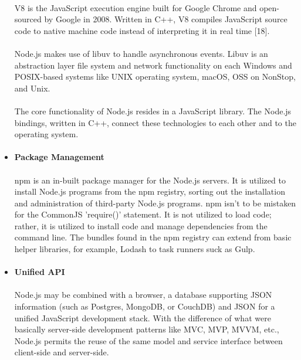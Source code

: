 \documentclass[../thesis.tex]{subfiles}
\begin{document}
\begin{itemize}
    \paragraph{}
    V8 is the JavaScript execution engine built for Google Chrome and open-sourced by Google in 2008. Written in C++, V8 compiles JavaScript source code to native machine code instead of interpreting it in real time [18].
    \paragraph{}
    Node.js makes use of libuv to handle asynchronous events. Libuv is an abstraction layer file system and network functionality on each Windows and POSIX-based systems like UNIX operating system, macOS, OSS on NonStop, and Unix.
    \paragraph{}
    The core functionality of Node.js resides in a JavaScript library. The Node.js bindings, written in C++, connect these technologies to each other and to the operating system.
    \paragraph{}
    \item \textbf{Package Management}
    \paragraph{}
    npm is an in-built package manager for the Node.js servers. It is utilized to install Node.js programs from the npm registry, sorting out the installation and administration of third-party Node.js programs. npm isn't to be mistaken for the CommonJS 'require()' statement. It is not utilized to load code; rather, it is utilized to install code and manage dependencies from the command line. The bundles found in the npm registry can extend from basic helper libraries, for example, Lodash to task runners suck as Gulp.
    \paragraph{}
    \item \textbf{Unified API}
    \paragraph{}
    Node.js may be combined with a browser, a database supporting JSON information (such as Postgres, MongoDB, or CouchDB) and JSON for a unified JavaScript development stack. With the difference of what were basically server-side development patterns like MVC, MVP, MVVM, etc., Node.js permits the reuse of the same model and service interface between client-side and server-side.

\end{itemize}
\end{document}
